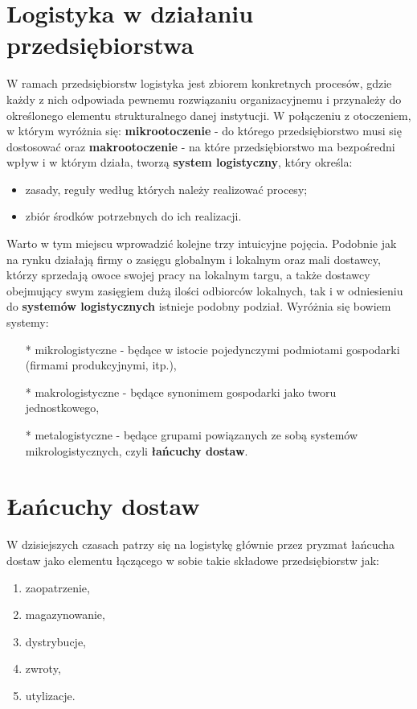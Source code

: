 \section{Logistyka w działaniu przedsiębiorstwa}  
	W ramach przedsiębiorstw logistyka jest zbiorem konkretnych procesów, 
	gdzie każdy z nich odpowiada pewnemu rozwiązaniu organizacyjnemu i przynależy do określonego 
	elementu strukturalnego danej instytucji. W połączeniu z otoczeniem, w którym wyróżnia się:
	\textbf{mikrootoczenie} - do którego przedsiębiorstwo musi się dostosować oraz 
	\textbf{makrootoczenie} - na które przedsiębiorstwo ma bezpośredni wpływ i w którym działa,
	tworzą \textbf{system logistyczny}, który określa:
	\begin{itemize}
		\item zasady, reguły według których należy realizować procesy;
		\item zbiór środków potrzebnych do ich realizacji.
	\end{itemize}
	Warto w tym miejscu wprowadzić kolejne trzy intuicyjne pojęcia. Podobnie jak na rynku
	działają firmy o zasięgu globalnym i lokalnym oraz mali dostawcy, którzy sprzedają
	owoce swojej pracy na lokalnym targu, a także dostawcy obejmujący swym zasięgiem dużą ilości
	odbiorców lokalnych, tak i w odniesieniu do \textbf{systemów logistycznych}
	istnieje podobny podział. Wyróżnia się bowiem systemy:
	\begin{itemize}
		\item[*] mikrologistyczne 	- będące w istocie pojedynczymi podmiotami gospodarki (firmami produkcyjnymi, itp.),
		\item[*] makrologistyczne 	- będące synonimem gospodarki jako tworu jednostkowego,
		\item[*] metalogistyczne	- będące grupami powiązanych ze sobą systemów mikrologistycznych, 
		czyli \textbf{łańcuchy dostaw}\cite{systemy_logistyczne_podstawy_funkcjonowania}.
	\end{itemize}

\section{Łańcuchy dostaw}
\label{c2:supply_chains}
	W dzisiejszych czasach patrzy się na logistykę 
	głównie przez pryzmat łańcucha dostaw jako
	elementu łączącego w sobie takie składowe przedsiębiorstw jak:
	\begin{enumerate}
		\item zaopatrzenie,
		\item magazynowanie,
		\item dystrybucje,
		\item zwroty,
		\item utylizacje.
	\end{enumerate}
	
